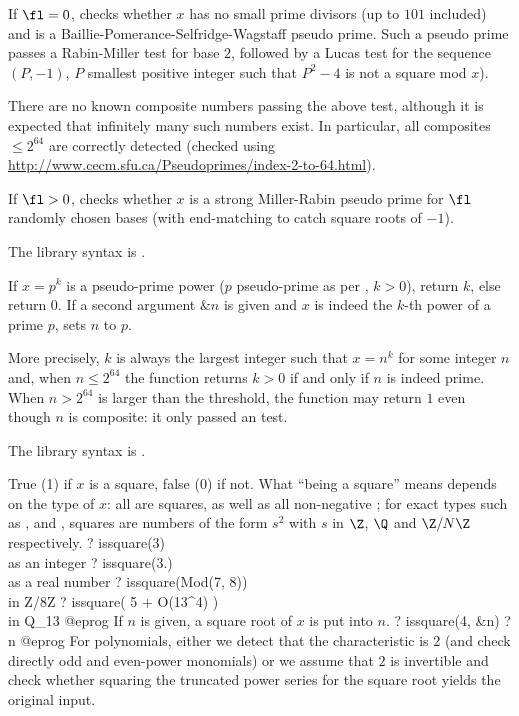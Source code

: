 If $\fl = 0$, checks whether $x$ has no small prime divisors (up to $101$
included) and is a Baillie-Pomerance-Selfridge-Wagstaff pseudo prime.
Such a pseudo prime passes a Rabin-Miller test for base $2$,
followed by a Lucas test for the sequence $(P,-1)$, $P$ smallest
positive integer such that $P^2 - 4$ is not a square mod $x$).

There are no known composite numbers passing the above test, although it is
expected that infinitely many such numbers exist. In particular, all
composites $\leq 2^{64}$ are correctly detected (checked using
\url{http://www.cecm.sfu.ca/Pseudoprimes/index-2-to-64.html}).

If $\fl > 0$, checks whether $x$ is a strong Miller-Rabin pseudo prime  for
$\fl$ randomly chosen bases (with end-matching to catch square roots of $-1$).

The library syntax is .

\label{se:ispseudoprimepower}
If $x = p^k$ is a pseudo-prime power ($p$ pseudo-prime as per
, $k > 0$), return $k$, else
return 0. If a second argument $\&n$ is given and $x$ is indeed
the $k$-th power of a prime $p$, sets $n$ to $p$.

More precisely, $k$ is always the largest integer such that $x = n^k$ for
some integer $n$ and, when $n \leq  2^{64}$ the function returns $k > 0$ if and
only if $n$ is indeed prime. When $n > 2^{64}$ is larger than the threshold,
the function may return $1$ even though $n$ is composite: it only passed
an  test.

The library syntax is .

\label{se:issquare}
True (1) if $x$ is a square, false (0)
if not. What ``being a square'' means depends on the type of $x$: all
 are squares, as well as all non-negative ; for
exact types such as ,  and , squares are
numbers of the form $s^2$ with $s$ in $\Z$, $\Q$ and $\Z/N\Z$ respectively.
\bprog
? issquare(3)          \\ as an integer
? issquare(3.)         \\ as a real number
? issquare(Mod(7, 8))  \\ in Z/8Z
? issquare( 5 + O(13^4) )  \\ in Q_13
@eprog
If $n$ is given, a square root of $x$ is put into $n$.
\bprog
? issquare(4, &n)
? n
@eprog
For polynomials, either we detect that the characteristic is 2 (and check
directly odd and even-power monomials) or we assume that $2$ is invertible
and check whether squaring the truncated power series for the square root
yields the original input.

